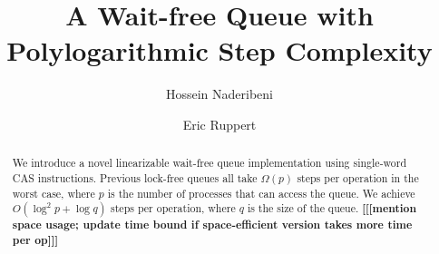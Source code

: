 \documentclass[acmsmall,nonacm,anonymous]{acmart}
\numberwithin{equation}{section}
\newcommand{\here}[1]{\bf{[[[#1]]]}}
\newcommand{\here}[1]{}  %
\renewcommand{\bf}[1]{\textbf{#1}}
\begin{document}
\title{A Wait-free Queue with Polylogarithmic Step Complexity}



\author{Hossein Naderibeni}
\author{Eric Ruppert}


\begin{abstract}
We introduce a novel linearizable wait-free queue implementation using single-word 
CAS instructions.
Previous lock-free queues all take $\Omega(p)$ steps per operation in the worst case, 
where $p$ is the number of processes that can access the queue.
We achieve $O(\log^2 p +\log q)$ steps per operation, where $q$ is the size of the queue.
\here{mention space usage; update time bound if space-efficient version takes more time per op}
\end{abstract}



\maketitle








\end{document}
